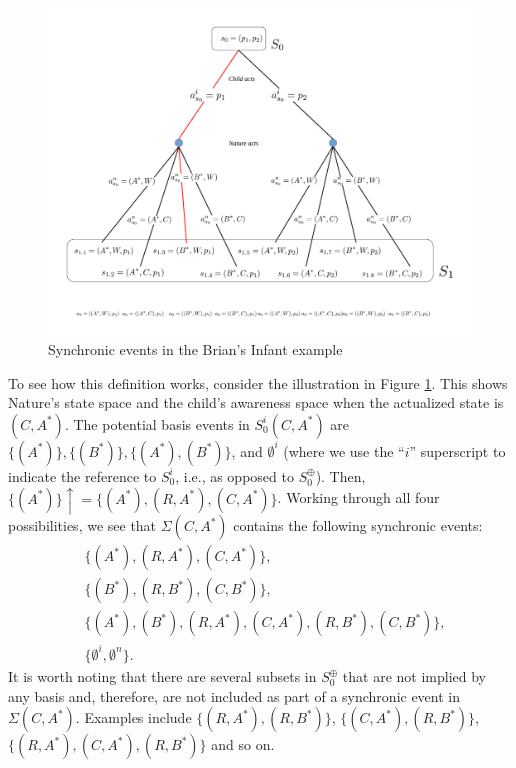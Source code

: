 \documentclass[
11pt,
titlepage,
reqno,
]{article}%
\theoremstyle{definition}
\begin{document}
	
	\begin{figure}[h!]
		\centering
		\includegraphics*[page=4,trim = 0in 3.5in 1.5in 0in,scale=.7]{Awareness_Diagrams_All}
		\caption{Synchronic events in the Brian's Infant example\label{Diag: p-04}}%
	\end{figure}
	
	To see how this definition works, consider the illustration in Figure \ref{Diag: p-04}. 
	This shows Nature's state space and the child's  awareness space when the actualized state is $(C,A^\ast)$. 
	The potential basis events in $S^i_0(C,A^\ast)$ are $\{(A^\ast)\},\{(B^\ast)\},\{(A^\ast),(B^\ast)\}$, and $\emptyset^i$ (where we use the ``$i$'' superscript to indicate the reference to $S^i_0$, i.e., as opposed to $S^\oplus_0$). 
	Then, $\{(A^\ast)\}\uparrow = \{(A^\ast), (R,A^\ast),(C,A^\ast)\}$. 
	Working through all four possibilities, we see that $\Sigma(C,A^\ast)$ contains the following synchronic events:
	\begin{align*}
		&	\{(A^\ast), (R,A^\ast),(C,A^\ast)\},\\
		&	\{(B^\ast), (R,B^\ast),(C,B^\ast)\},\\
		&	\{(A^\ast), (B^\ast), (R,A^\ast),(C,A^\ast), (R,B^\ast),(C,B^\ast)\},\\
		&	\{\emptyset^i,\emptyset^n\}.
	\end{align*}
	It is worth noting that there are several subsets in $S^\oplus_0$ that are not implied by any basis and, therefore, are not included as part of a synchronic event in $\Sigma(C,A^\ast)$. Examples include $\{(R,A^\ast),(R,B^\ast)\}$, $\{(C,A^\ast),(R,B^\ast)\}$, $\{(R,A^\ast),(C,A^\ast),(R,B^\ast)\}$ and so on. 
	
\end{document}
